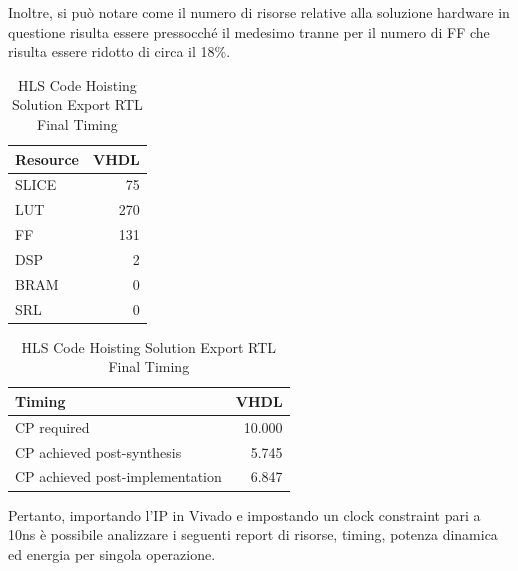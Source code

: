 Inoltre, si può notare come il numero di risorse relative alla soluzione hardware in questione risulta essere pressocché il medesimo tranne per il numero di FF che risulta essere ridotto di circa il 18\%.

\begin{table}[H]
    \centering
    \begin{minipage}[t]{0.45\linewidth}
        \centering
        \begin{tabular}{|l|r|}
            \hline
            \textbf{Resource} & \textbf{VHDL} \\
            \hline
            SLICE & 75 \\
            \hline
            LUT & 270 \\
            \hline
            FF & 131 \\
            \hline
            DSP & 2 \\
            \hline
            BRAM & 0 \\
            \hline
            SRL & 0 \\
            \hline
        \end{tabular}
        \caption{HLS Code Hoisting Solution Export RTL Resource Usage}
        \label{tab:hls-code-hoisting-solution-export-rtl-resoruce-usage}
    \end{minipage}
    \hfill
    \begin{minipage}[t]{0.45\linewidth}
        \centering
        \begin{tabular}{|l|r|}
            \hline
            \textbf{Timing} & \textbf{VHDL} \\
            \hline
            CP required & 10.000 \\
            \hline
            CP achieved post-synthesis & 5.745 \\
            \hline
            CP achieved post-implementation & 6.847 \\
            \hline
        \end{tabular}
        \caption{HLS Code Hoisting Solution Export RTL Final Timing}
        \label{tab:hls-code-hoisting-solution-export-rtl-final-timing}
    \end{minipage}
\end{table}

Pertanto, importando l'IP in Vivado e impostando un clock constraint pari a 10ns è possibile analizzare i seguenti report di risorse, timing, potenza dinamica ed energia per singola operazione.


